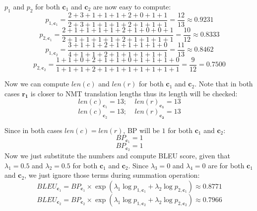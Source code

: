 \begin{parts}
\begin{subparts}
{        	$p_1$ and $p_2$ for both $\mathbf{c}_1$ and $\mathbf{c}_2$ are now easy to compute:
        	\begin{equation}
        		p_{1, \mathbf{c}_1} = \frac{2+3+1+1+1+2+0+1+1}{2+3+1+1+1+2+1+1+1} = \frac{12}{13} \approx 0.9231
        	\end{equation}
        	\begin{equation}
        		p_{2, \mathbf{c}_1} = \frac{2+1+1+1+1+2+1+0+0+1}{2+1+1+1+1+2+1+1+1+1} = \frac{10}{12} \approx 0.8333
        	\end{equation}
        	\begin{equation}
        		p_{1, \mathbf{c}_2} = \frac{3+1+1+2+1+1+1+1+0}{4+1+1+2+1+1+1+1+1} = \frac{11}{13} \approx 0.8462
        	\end{equation}
        	\begin{equation}
        		p_{2, \mathbf{c}_2} = \frac{1+1+0+2+1+1+0+1+1+1+0}{1+1+1+2+1+1+1+1+1+1+1} = \frac{9}{12} = 0.7500
        	\end{equation}
        	
        	Now we can compute $len(c)$ and $len(r)$ for both $\mathbf{c}_1$ and $\mathbf{c}_2$. Note that in both cases $\mathbf{r_1}$ is closer to NMT translation lengths thus its length will be checked:
        	\begin{equation}
        		len(c)_{\mathbf{c}_1}=13;\ \text{ }\ len(r)_{\mathbf{c_1}}=13
        	\end{equation}
        	\begin{equation}
        		len(c)_{\mathbf{c}_2}=13;\ \text{ }\ len(r)_{\mathbf{c_2}}=13
        	\end{equation}
        	
        	Since in both cases $len(c)=len(r)$, BP will be $1$ for both $\mathbf{c}_1$ and $\mathbf{c}_2$:
        	\begin{equation}
        		BP_{\mathbf{c}_1}=1
        	\end{equation}
        	\begin{equation}
        		BP_{\mathbf{c}_2}=1
        	\end{equation}
        	Now we just substitute the numbers and compute BLEU score, given that $\lambda_1=0.5$ and $\lambda_2=0.5$ for both $\mathbf{c}_1$ and $\mathbf{c}_2$. Since $\lambda_3=0$ and $\lambda_4=0$ are for both $\mathbf{c}_1$ and $\mathbf{c}_2$, we just ignore those terms during summation operation:
        	\begin{equation}
        		BLEU_{\mathbf{c}_1}=BP_{\mathbf{c}_1}\times\exp\left(\lambda_1\log p_{1, \mathbf{c}_1}+\lambda_2\log p_{2, \mathbf{c}_1}\right)\approx 0.8771
        	\end{equation}
        	\begin{equation}
        		BLEU_{\mathbf{c}_2}=BP_{\mathbf{c}_2}\times\exp\left(\lambda_1\log p_{1, \mathbf{c}_2}+\lambda_2\log p_{2, \mathbf{c}_2}\right)\approx 0.7966
        	\end{equation}
        	
}
\end{subparts}
\end{parts}
